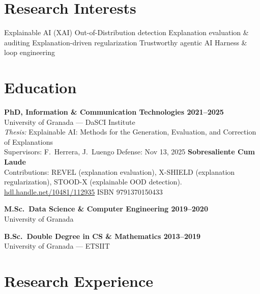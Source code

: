 \documentclass[10pt,a4paper]{article}
\newcommand{\blueitem}[1]{\textcolor{subtitleblue}{\textbf{#1}}}
\newcommand{\sub}[1]{\textcolor{subtle}{\footnotesize #1}}
\begin{document}
\section*{Research Interests}

Explainable AI (XAI) \quad\textbar\quad Out-of-Distribution detection \quad\textbar\quad Explanation evaluation \& auditing \quad\textbar\quad Explanation-driven regularization \quad\textbar\quad Trustworthy agentic AI \quad\textbar\quad Harness \& loop engineering

\section*{Education}

\blueitem{PhD, Information \& Communication Technologies \hfill 2021--2025} \\
\sub{University of Granada --- DaSCI Institute} \\
\textit{Thesis:} Explainable AI: Methods for the Generation, Evaluation, and Correction of Explanations \\
\sub{Supervisors: F.~Herrera, J.~Luengo \quad Defense: Nov 13, 2025 \quad \textbf{Sobresaliente Cum Laude}} \\
\sub{Contributions: REVEL (explanation evaluation), X-SHIELD (explanation regularization), STOOD-X (explainable OOD detection). \href{https://hdl.handle.net/10481/112935}{hdl.handle.net/10481/112935} \quad ISBN 9791370150433}

\vspace{0.2em}

\blueitem{M.Sc.~Data Science \& Computer Engineering \hfill 2019--2020} \\
\sub{University of Granada}

\vspace{0.2em}

\blueitem{B.Sc.~Double Degree in CS \& Mathematics \hfill 2013--2019} \\
\sub{University of Granada --- ETSIIT}

\section*{Research Experience}
\end{document}
